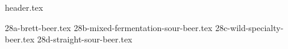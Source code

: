 \clearpage
{}
\divisorLine

{header.tex}

\begin{multicols}{2}

{28a-brett-beer.tex}
{28b-mixed-fermentation-sour-beer.tex}
{28c-wild-specialty-beer.tex}
{28d-straight-sour-beer.tex}

\end{multicols}